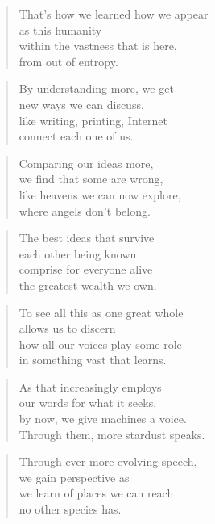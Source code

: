 \documentclass[14pt,a4paper]{article}
\begin{document}
\begin{verse}
That’s how we learned how we appear\\
as this humanity\\
within the vastness that is here,\\
from out of entropy.
\end{verse}

\begin{verse}
By understanding more, we get\\
new ways we can discuss,\\
like writing, printing, Internet\\
connect each one of us.
\end{verse}

\begin{verse}
Comparing our ideas more,\\
we find that some are wrong,\\
like heavens we can now explore,\\
where angels don’t belong.
\end{verse}

\begin{verse}
The best ideas that survive\\
each other being known\\
comprise for everyone alive\\
the greatest wealth we own.
\end{verse}

\begin{verse}
To see all this as one great whole\\
allows us to discern\\
how all our voices play some role\\
in something vast that learns.
\end{verse}

\begin{verse}
As that increasingly employs\\
our words for what it seeks,\\
by now, we give machines a voice.\\
Through them, more stardust speaks.
\end{verse}

\begin{verse}
Through ever more evolving speech,\\
we gain perspective as\\
we learn of places we can reach\\
no other species has.
\end{verse}
\end{document}

